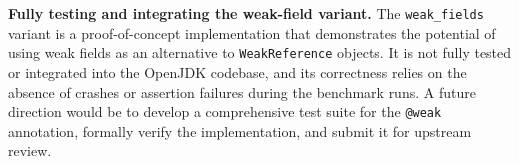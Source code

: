 \textbf{Fully testing and integrating the weak-field variant.} The \texttt{weak\_fields} variant is a proof-of-concept implementation that demonstrates the potential of using weak fields as an alternative to \texttt{WeakReference} objects. It is not fully tested or integrated into the OpenJDK codebase, and its correctness relies on the absence of crashes or assertion failures during the benchmark runs. A future direction would be to develop a comprehensive test suite for the \texttt{@weak} annotation, formally verify the implementation, and submit it for upstream review.